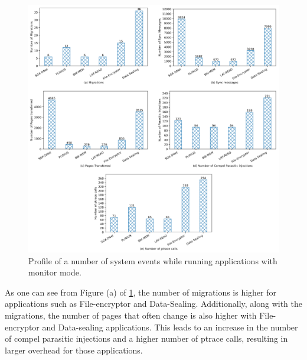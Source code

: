 \documentclass[article, doublespace,nopageskip]{VTthesis} %
\begin{document}
    \begin{figure}[H]
    \centering
    \includegraphics[scale=1.1]{figures/perf_char_monitor.png}
    \caption{Profile of a number of system events while running applications with monitor mode.} 
    \label{fig:client_instructions}
    \end{figure}

    As one can see from Figure (a) of \ref{fig:client_instructions}, the number of migrations is higher for applications such as File-encryptor and Data-Sealing. Additionally, along with the migrations, the number of pages that often change is also higher with File-encryptor and Data-sealing applications. This leads to an increase in the number of compel parasitic injections and a higher number of ptrace calls, resulting in larger overhead for those applications.
    
\end{document}
